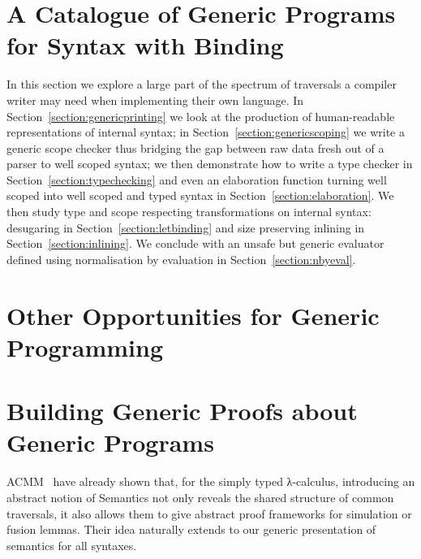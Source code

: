 \section{A Catalogue of Generic Programs for Syntax with Binding}

In this section we explore a large part of the spectrum of traversals a
compiler writer may need when implementing their own language.
In Section~\ref{section:genericprinting} we look at the production of
human-readable representations of internal syntax; in Section~\ref{section:genericscoping}
we write a generic scope checker thus bridging the gap between raw data
fresh out of a parser to well scoped syntax; we then demonstrate how to
write a type checker in Section~\ref{section:typechecking} and even an
elaboration function turning well scoped into well scoped and typed syntax
in Section~\ref{section:elaboration}. We then study type and scope respecting
transformations on internal syntax: desugaring in Section~\ref{section:letbinding}
and size preserving inlining in Section~\ref{section:inlining}. We conclude
with an unsafe but generic evaluator defined using normalisation by evaluation
in Section~\ref{section:nbyeval}.











\section{Other Opportunities for Generic Programming}





\section{Building Generic Proofs about Generic Programs}

ACMM~\citeyear{allais2017type} have
already shown that, for the simply typed λ-calculus, introducing an abstract
notion of Semantics not only reveals the shared structure of common
traversals, it also allows them to give abstract proof frameworks for
simulation or fusion lemmas. Their idea naturally extends to our generic
presentation of semantics for all syntaxes.

